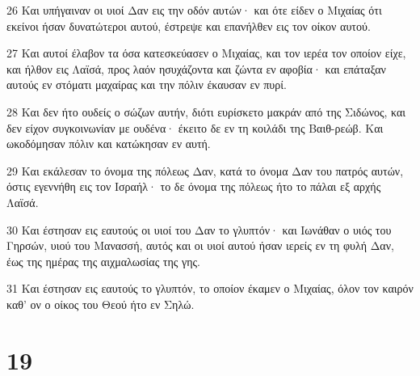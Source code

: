 \par 26 Και υπήγαιναν οι υιοί Δαν εις την οδόν αυτών· και ότε είδεν ο Μιχαίας ότι εκείνοι ήσαν δυνατώτεροι αυτού, έστρεψε και επανήλθεν εις τον οίκον αυτού.
\par 27 Και αυτοί έλαβον τα όσα κατεσκεύασεν ο Μιχαίας, και τον ιερέα τον οποίον είχε, και ήλθον εις Λαϊσά, προς λαόν ησυχάζοντα και ζώντα εν αφοβία· και επάταξαν αυτούς εν στόματι μαχαίρας και την πόλιν έκαυσαν εν πυρί.
\par 28 Και δεν ήτο ουδείς ο σώζων αυτήν, διότι ευρίσκετο μακράν από της Σιδώνος, και δεν είχον συγκοινωνίαν με ουδένα· έκειτο δε εν τη κοιλάδι της Βαιθ-ρεώβ. Και ωκοδόμησαν πόλιν και κατώκησαν εν αυτή.
\par 29 Και εκάλεσαν το όνομα της πόλεως Δαν, κατά το όνομα Δαν του πατρός αυτών, όστις εγεννήθη εις τον Ισραήλ· το δε όνομα της πόλεως ήτο το πάλαι εξ αρχής Λαϊσά.
\par 30 Και έστησαν εις εαυτούς οι υιοί του Δαν το γλυπτόν· και Ιωνάθαν ο υιός του Γηρσών, υιού του Μανασσή, αυτός και οι υιοί αυτού ήσαν ιερείς εν τη φυλή Δαν, έως της ημέρας της αιχμαλωσίας της γης.
\par 31 Και έστησαν εις εαυτούς το γλυπτόν, το οποίον έκαμεν ο Μιχαίας, όλον τον καιρόν καθ' ον ο οίκος του Θεού ήτο εν Σηλώ.

\chapter{19}

